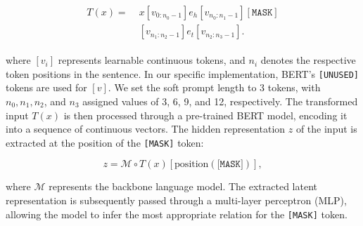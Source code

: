 \begin{align}
\begin{aligned}
  T({x}) = \; &x \left[v_{0:n_0-1}\right] e_h \left[v_{n_0:n_1-1}\right] [\texttt{MASK}] \\
  &\left[v_{n_1:n_2-1}\right] e_t \left[v_{n_2:n_3-1}\right].
\label{eq:template}
\end{aligned}
\end{align}

where $[v_i]$ represents learnable continuous tokens, and $n_i$ denotes the respective token positions in the sentence. In our specific implementation, BERT’s \texttt{[UNUSED]} tokens are used for $[v]$. We set the soft prompt length to 3 tokens, with $n_0, n_1, n_2$, and $n_3$ assigned values of 3, 6, 9, and 12, respectively. The transformed input $T(x)$ is then processed through a pre-trained BERT model, encoding it into a sequence of continuous vectors. The hidden representation $z$ of the input is extracted at the position of the \texttt{[MASK]} token:

\begin{equation}
    z = \mathcal{M} \circ T(x)[\text{position}(\texttt{[MASK]})],
\end{equation}

where $\mathcal{M}$ represents the backbone language model. The extracted latent representation is subsequently passed through a multi-layer perceptron (MLP), allowing the model to infer the most appropriate relation for the \texttt{[MASK]} token.


